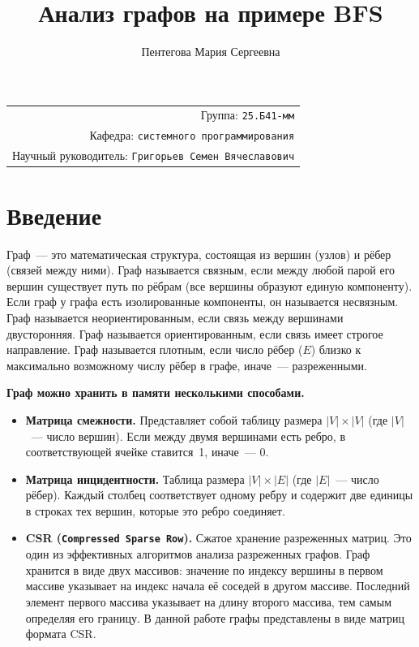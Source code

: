 \documentclass[a4paper]{article}
\title{Анализ графов на примере BFS}
\author{Пентегова Мария Сергеевна}
\date{}
\begin{document}
\maketitle

\begin{flushright}
\begin{tabular}{r}
    Группа: \texttt{25.Б41-мм} \\
    Кафедра: \texttt{системного программирования} \\
    Научный руководитель: \texttt{Григорьев Семен Вячеславович} \\
\end{tabular}
\end{flushright}

\section{Введение}

Граф~--- это математическая структура, состоящая из вершин (узлов) и рёбер (связей между ними). Граф называется связным, если между любой парой его вершин существует путь по рёбрам (все вершины образуют единую компоненту). Если граф у графа есть изолированные компоненты, он называется несвязным. Граф называется неориентированным, если связь между вершинами двусторонняя. Граф называется ориентированным, если связь имеет строгое направление. Граф называется плотным, если число рёбер (\(E\)) близко к максимально возможному числу рёбер в графе, иначе~--- разреженными.

\textbf{Граф можно хранить в памяти несколькими способами.}

\begin{itemize}
    \item \textbf{Матрица смежности.} Представляет собой таблицу размера $|V| \times |V|$ (где $|V|$~--- число вершин). Если между двумя вершинами есть ребро, в соответствующей ячейке ставится~1, иначе~--- 0.
    \item \textbf{Матрица инцидентности.} Таблица размера $|V| \times |E|$ (где $|E|$~--- число рёбер). Каждый столбец соответствует одному ребру и содержит две единицы в строках тех вершин, которые это ребро соединяет.
    \item \textbf{CSR (\texttt{Compressed Sparse Row}).} Сжатое хранение разреженных матриц. Это один из эффективных алгоритмов анализа разреженных графов. Граф хранится в виде двух массивов: значение по индексу вершины в первом массиве указывает на индекс начала её соседей в другом массиве. Последний элемент первого массива указывает на длину второго массива, тем самым определяя его границу. В данной работе графы представлены в виде матриц формата CSR.
\end{itemize}
\end{document}

